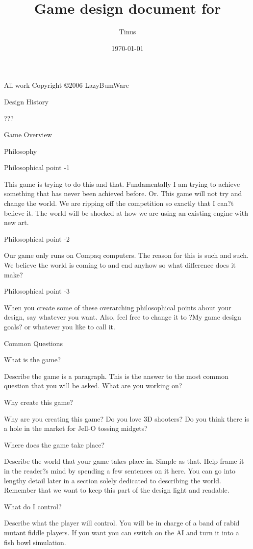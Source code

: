 \documentclass[a4paper]{article}
\title{Game design document for \\ \nadruk{The Scattered Lands}}
\author{Tinus}
\date{\today}
\begin{document}
\maketitle
\tableofcontents


All work Copyright \copyright 2006 LazyBumWare

Design History

	???


Game Overview

	Philosophy

		Philosophical point -1

			This game is trying to do this and that.  Fundamentally I am trying to achieve something that has never been achieved before.  Or.  This game will not try and change the world.  We are ripping off the competition so exactly that I can?t believe it.  The world will be shocked at how we are using an existing engine with new art.

		Philosophical point -2

			Our game only runs on Compaq computers.  The reason for this is such and such.  We believe the world is coming to and end anyhow so what difference does it make?

		Philosophical point -3

			When you create some of these overarching philosophical points about your design, say whatever you want.  Also, feel free to change it to ?My game design goals? or whatever you like to call it.

	Common Questions

		What is the game?

			Describe the game is a paragraph.  This is the answer to the most common question that you will be asked.  What are you working on?

Why create this game?

	Why are you creating this game?  Do you love 3D shooters?  Do you think there is a hole in the market for Jell-O tossing midgets?

Where does the game take place?

	Describe the world that your game takes place in.  Simple as that.  Help frame it in the reader?s mind by spending a few sentences on it here.  You can go into lengthy detail later in a section solely dedicated to describing the world.  Remember that we want to keep this part of the design light and readable.

What do I control?

	Describe what the player will control.  You will be in charge of a band of rabid mutant fiddle players.  If you want you can switch on the AI and turn it into a fish bowl simulation.
\end{document}
